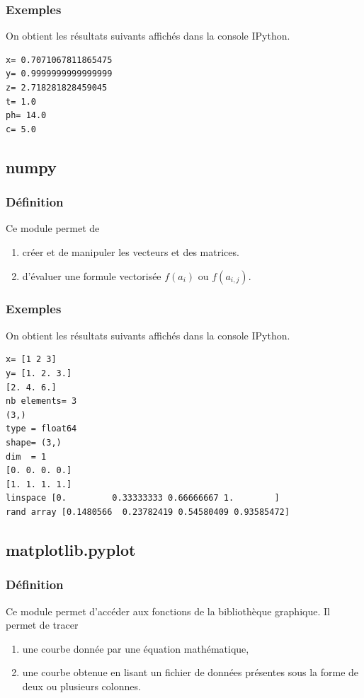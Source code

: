 \documentclass[a4paper,12pt]{article}
\begin{document}
\subsubsection{Exemples}


On obtient les résultats suivants affichés dans la console IPython.

\begin{verbatim}
x= 0.7071067811865475
y= 0.9999999999999999
z= 2.718281828459045
t= 1.0
ph= 14.0
c= 5.0
\end{verbatim}
\clearpage
\subsection{numpy}
\subsubsection{Définition}
\begin{leftbar}
Ce module permet de
\begin{enumerate}
\item  cr\'eer et de manipuler les vecteurs et des matrices. 
\item d'\'evaluer une formule vectoris\'ee $f(a_i)$ ou $f(a_{i,j})$.
\end{enumerate}
\end{leftbar}

\subsubsection{Exemples}


On obtient les résultats suivants affichés dans la console IPython.
\begin{verbatim}
x= [1 2 3]
y= [1. 2. 3.]
[2. 4. 6.]
nb elements= 3
(3,)
type = float64
shape= (3,)
dim  = 1
[0. 0. 0. 0.]
[1. 1. 1. 1.]
linspace [0.         0.33333333 0.66666667 1.        ]
rand array [0.1480566  0.23782419 0.54580409 0.93585472]
\end{verbatim}

\clearpage
\subsection{matplotlib.pyplot}
\subsubsection{Définition}
\begin{leftbar}
Ce module permet d'acc\'eder aux fonctions de la biblioth\`eque graphique.
Il permet de tracer
\begin{enumerate}
\item une courbe donnée par une équation mathématique,
\item une courbe obtenue en lisant un fichier de données présentes sous la forme de deux ou plusieurs colonnes.
\end{enumerate}
\end{leftbar}
\end{document}
